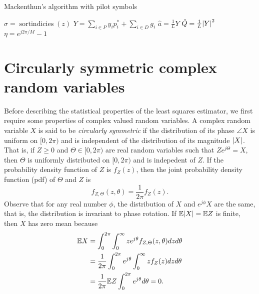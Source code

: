 \documentclass[journal]{IEEEtran}
\begin{document}
\begin{algorithm}[t] \label{alg:loglinear}
\SetAlCapFnt{\small}
\SetAlTitleFnt{}
\caption{Mackenthun's algorithm with pilot symbols}
\DontPrintSemicolon
{}
$\sigma = \operatorname{sortindicies}(z)$  \;
$Y = \sum_{i \in P} y_i p_i^* + \sum_{i \in D} g_i $ \;
$\hat{a} = \frac{1}{L} Y$ \;
$\hat{Q} = \frac{1}{L}{\left\vert Y \right\vert}^2$  \;
$\eta = e^{j2\pi/M} - 1$ \;
\end{algorithm}


\section{Circularly symmetric complex random variables}\label{sec:circ-symm-compl}

Before describing the statistical properties of the least squares estimator, we first require some properties of complex valued random variables.  A complex random variable $X$ is said to be \emph{circularly symmetric} if the distribution of its phase $\angle{X}$ is uniform on $[0,2\pi)$ and is independent of the distribution of its magnitude ${\left\vert X \right\vert}$.  That is, if $Z \geq 0$ and $\Theta \in [0,2\pi)$ are real random variables such that $Ze^{j\Theta} = X$, then $\Theta$ is uniformly distributed on $[0,2\pi)$ and is indepedent of $Z$.  If the probability density function of $Z$ is $f_Z(z)$, then the joint probability density function (pdf) of $\Theta$ and $Z$ is 
\[
f_{Z,\Theta}(z,\theta) = \frac{1}{2\pi}f_Z(z).
\]  
Observe that for any real number $\phi$, the distribution of $X$ and $e^{j\phi}X$ are the same, that is, the distribution is invariant to phase rotation.  If ${\mathbb E}{\left\vert X \right\vert} = {\mathbb E} Z$ is finite, then $X$ has zero mean because
\begin{align*}
{\mathbb E} X &= \int_{0}^{2\pi} \int_{0}^\infty z e^{j\theta} f_{Z,\Theta}(z,\theta) dz d\theta \\
&= \frac{1}{2\pi} \int_{0}^{2\pi} e^{j\theta} \int_{0}^\infty z f_Z(z) dz d\theta \\
&= \frac{1}{2\pi}{\mathbb E} Z \int_{0}^{2\pi} e^{j\theta} d\theta = 0.
\end{align*}
\end{document}
